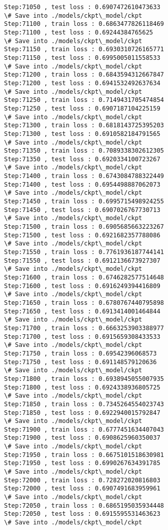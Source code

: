 \documentclass[11pt]{article}
\begin{document}
\begin{Verbatim}[commandchars=\\\{\}]
Step:71050 , test loss : 0.6907472610473633
\# Save into ./models/ckpt\_model/ckpt
Step:71100 , train loss : 0.6863477826118469
Step:71100 , test loss : 0.69244384765625
\# Save into ./models/ckpt\_model/ckpt
Step:71150 , train loss : 0.6930310726165771
Step:71150 , test loss : 0.6995005011558533
\# Save into ./models/ckpt\_model/ckpt
Step:71200 , train loss : 0.6843594312667847
Step:71200 , test loss : 0.6941532492637634
\# Save into ./models/ckpt\_model/ckpt
Step:71250 , train loss : 0.7149431705474854
Step:71250 , test loss : 0.6907187104225159
\# Save into ./models/ckpt\_model/ckpt
Step:71300 , train loss : 0.6818143725395203
Step:71300 , test loss : 0.6910582184791565
\# Save into ./models/ckpt\_model/ckpt
Step:71350 , train loss : 0.7089338302612305
Step:71350 , test loss : 0.6920334100723267
\# Save into ./models/ckpt\_model/ckpt
Step:71400 , train loss : 0.6743084788322449
Step:71400 , test loss : 0.6954498887062073
\# Save into ./models/ckpt\_model/ckpt
Step:71450 , train loss : 0.6995715498924255
Step:71450 , test loss : 0.6907026767730713
\# Save into ./models/ckpt\_model/ckpt
Step:71500 , train loss : 0.6905685663223267
Step:71500 , test loss : 0.6921682357788086
\# Save into ./models/ckpt\_model/ckpt
Step:71550 , train loss : 0.7761936187744141
Step:71550 , test loss : 0.6912136673927307
\# Save into ./models/ckpt\_model/ckpt
Step:71600 , train loss : 0.6746282577514648
Step:71600 , test loss : 0.6916249394416809
\# Save into ./models/ckpt\_model/ckpt
Step:71650 , train loss : 0.6780767440795898
Step:71650 , test loss : 0.6913414001464844
\# Save into ./models/ckpt\_model/ckpt
Step:71700 , train loss : 0.6663253903388977
Step:71700 , test loss : 0.6915659308433533
\# Save into ./models/ckpt\_model/ckpt
Step:71750 , train loss : 0.69542396068573
Step:71750 , test loss : 0.691148579120636
\# Save into ./models/ckpt\_model/ckpt
Step:71800 , train loss : 0.6938945055007935
Step:71800 , test loss : 0.6924338936805725
\# Save into ./models/ckpt\_model/ckpt
Step:71850 , train loss : 0.7345264554023743
Step:71850 , test loss : 0.6922940015792847
\# Save into ./models/ckpt\_model/ckpt
Step:71900 , train loss : 0.6777451634407043
Step:71900 , test loss : 0.6908625960350037
\# Save into ./models/ckpt\_model/ckpt
Step:71950 , train loss : 0.6675101518630981
Step:71950 , test loss : 0.6990267634391785
\# Save into ./models/ckpt\_model/ckpt
Step:72000 , train loss : 0.728272020816803
Step:72000 , test loss : 0.6907491683959961
\# Save into ./models/ckpt\_model/ckpt
Step:72050 , train loss : 0.6865195035934448
Step:72050 , test loss : 0.6915595531463623
\# Save into ./models/ckpt\_model/ckpt

\end{Verbatim}
\end{document}
